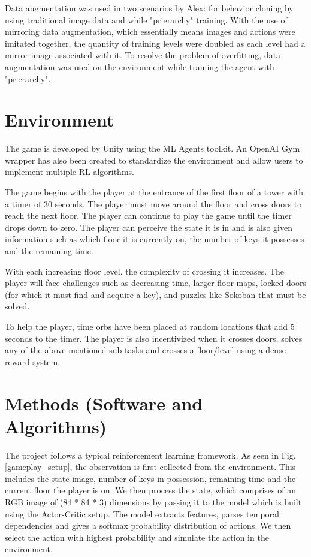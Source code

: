 \documentclass[conference]{IEEEtran}
\begin{document}
Data augmentation was used in two scenarios by Alex: for behavior cloning by using traditional image data and while "prierarchy" training. With the use of mirroring data augmentation, which essentially means images and actions were imitated together, the quantity of training levels were doubled as each level had a mirror image associated with it. To resolve the problem of overfitting, data augmentation was used on the environment while training the agent with "prierarchy". 


\section{Environment}
The game is developed by Unity using the ML Agents \cite{Unity_ml_agents_tech_blog} toolkit. An OpenAI Gym \cite{Open-ai-gym} wrapper has also been created to standardize the environment and allow users to implement multiple RL algorithms. 

The game begins with the player at the entrance of the first floor of a tower with a timer of 30 seconds. The player must move around the floor and cross doors to reach the next floor. The player can continue to play the game until the timer drops down to zero. The player can perceive the state it is in and is also given information such as which floor it is currently on, the number of keys it possesses and the remaining time. 

With each increasing floor level, the complexity of crossing it increases. The player will face challenges such as decreasing time, larger floor maps, locked doors (for which it must find and acquire a key), and puzzles like Sokoban \cite{Sokoban} that must be solved. 

To help the player, time orbs have been placed at random locations that add 5 seconds to the timer. The player is also incentivized when it crosses doors, solves any of the above-mentioned sub-tasks and crosses a floor/level using a dense reward system. 


\section{Methods (Software and Algorithms)}

The project follows a typical reinforcement learning framework. As seen in Fig. \ref{gameplay_setup}, the observation is first collected from the environment. This includes the state image, number of keys in possession, remaining time and the current floor the player is on. We then process the state, which comprises of an RGB image of (84 * 84 * 3) dimensions by passing it to the model which is built using the Actor-Critic setup. The model extracts features, parses temporal dependencies and gives a softmax probability distribution of actions. We then select the action with highest probability and simulate the action in the environment.
\end{document}
